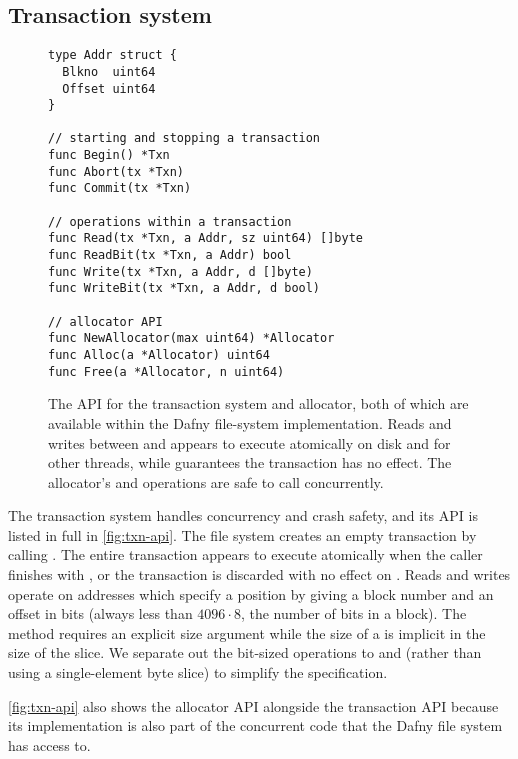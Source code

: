 \subsection{Transaction system}


\begin{figure}
\begin{verbatim}
type Addr struct {
  Blkno  uint64
  Offset uint64
}

// starting and stopping a transaction
func Begin() *Txn
func Abort(tx *Txn)
func Commit(tx *Txn)

// operations within a transaction
func Read(tx *Txn, a Addr, sz uint64) []byte
func ReadBit(tx *Txn, a Addr) bool
func Write(tx *Txn, a Addr, d []byte)
func WriteBit(tx *Txn, a Addr, d bool)

// allocator API
func NewAllocator(max uint64) *Allocator
func Alloc(a *Allocator) uint64
func Free(a *Allocator, n uint64)
\end{verbatim}
  \caption{The API for the transaction system and allocator, both of which are
    available within the Dafny file-system implementation. Reads and writes
    between  and  appears to execute atomically on disk and
    for other threads, while  guarantees the transaction has no
    effect. The allocator's  and  operations are safe to call
    concurrently.}
\label{fig:txn-api}
\end{figure}

The transaction system handles concurrency and crash safety, and its
API is listed in full in \autoref{fig:txn-api}.  The file system
creates an empty transaction by calling . The entire
transaction appears to execute atomically when the caller finishes
with , or the transaction is discarded with no effect on
. Reads and writes operate on addresses which specify a
position by giving a block number and an offset in bits (always less
than $4096 \cdot 8$, the number of bits in a block). The 
method requires an explicit size argument while the size of a
 is implicit in the size of the  slice. We separate
out the bit-sized operations to  and  (rather
than using a single-element byte slice) to simplify the specification.

\autoref{fig:txn-api} also shows the allocator API alongside the
transaction API because its implementation is also part of the
concurrent code that the Dafny file system has access to.

